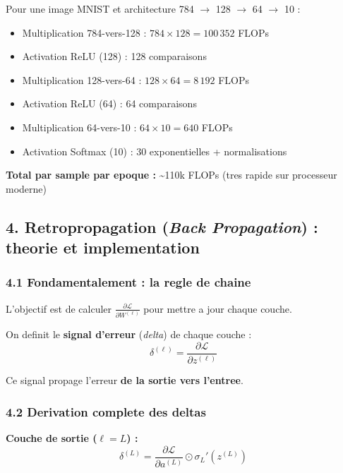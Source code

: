 \documentclass[
  letterpaper,
  DIV=11,
  numbers=noendperiod]{scrartcl}
\providecommand{\tightlist}{%
  \setlength{\itemsep}{0pt}\setlength{\parskip}{0pt}}
\begin{document}
Pour une image MNIST et architecture 784 $\to$ 128 $\to$ 64 $\to$ 10 :

\begin{itemize}
\tightlist
\item
  Multiplication 784-vers-128 : \(784 \times 128 = 100\,352\) FLOPs
\item
  Activation ReLU (128) : 128 comparaisons
\item
  Multiplication 128-vers-64 : \(128 \times 64 = 8\,192\) FLOPs
\item
  Activation ReLU (64) : 64 comparaisons
\item
  Multiplication 64-vers-10 : \(64 \times 10 = 640\) FLOPs
\item
  Activation Softmax (10) : 30 exponentielles + normalisations
\end{itemize}

\textbf{Total par sample par epoque :} \textasciitilde110k FLOPs (tres rapide sur processeur moderne)

\subsection{4. Retropropagation (\emph{Back Propagation}) : theorie et implementation}\label{retropropagation}

\subsubsection{4.1 Fondamentalement : la regle de chaine}\label{regle-de-chaine}

L'objectif est de calculer \(\frac{\partial \mathcal{L}}{\partial W^{(\ell)}}\) pour mettre a jour chaque couche.

On definit le \textbf{signal d'erreur} (\emph{delta}) de chaque couche :
\[\delta^{(\ell)} = \frac{\partial \mathcal{L}}{\partial z^{(\ell)}}\]

Ce signal propage l'erreur \textbf{de la sortie vers l'entree}.

\subsubsection{4.2 Derivation complete des deltas}\label{derivation-des-deltas}

\textbf{Couche de sortie ($\ell = L$) :}
\[\delta^{(L)} = \frac{\partial \mathcal{L}}{\partial a^{(L)}} \odot \sigma_L'(z^{(L)})\]
\end{document}
